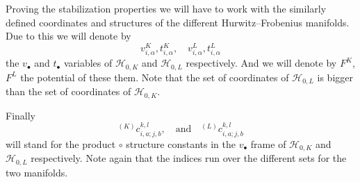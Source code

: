 \documentclass[12pt,a4paper]{amsart}
\def\H{{\mathcal H}}
\newcommand{\<}{\left<}
\renewcommand{\>}{\right>}
\numberwithin{equation}{section}
\begin{document}
Proving the stabilization properties we will have to work with the similarly defined coordinates and structures of the different Hurwitz--Frobenius manifolds. Due to this we will denote by
\[
    v_{i,\alpha}^K, t_{i,\alpha}^K, \quad v_{i,\alpha}^L, t_{i,\alpha}^L
\]
the $v_\bullet$ and $t_\bullet$ variables of $\H_{0,K}$ and $\H_{0,L}$ respectively. And we will denote by $F^{K}$, $F^{L}$  the potential of these them.
Note that the set of coordinates of $\H_{0,L}$ is bigger than the set of coordinates of $\H_{0,K}$.

Finally 
\[
 {}^{(K)}c_{i,a;j,b}^{k,l}, \quad \text{and} \quad {}^{(L)}c_{i,a;j,b}^{k,l}
\]
will stand for the product $\circ$ structure constants in the $v_\bullet$ frame of $\H_{0,K}$ and $\H_{0,L}$ respectively. Note again that the indices run over the different sets for the two manifolds.
\end{document}
